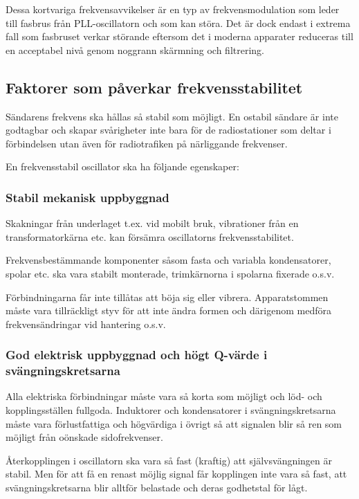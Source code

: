 Dessa kortvariga frekvensavvikelser är en typ av frekvensmodulation
som leder till fasbrus från PLL-oscillatorn och som kan störa.
Det är dock endast i extrema fall som fasbruset verkar störande eftersom det
i moderna apparater reduceras till en acceptabel nivå genom noggrann
skärmning och filtrering.

\subsection{Faktorer som påverkar frekvensstabilitet}

Sändarens frekvens ska hållas så stabil som möjligt.
En ostabil sändare är inte godtagbar och skapar svårigheter inte bara för de
radiostationer som deltar i förbindelsen utan även för radiotrafiken
på närliggande frekvenser.

En frekvensstabil oscillator ska ha följande egenskaper:

\subsubsection{Stabil mekanisk uppbyggnad}

Skakningar från underlaget t.ex. vid mobilt bruk, vibrationer från en
transformatorkärna etc. kan försämra oscillatorns frekvensstabilitet.

Frekvensbestämmande komponenter såsom fasta och variabla kondensatorer, spolar
etc. ska vara stabilt monterade, trimkärnorna i spolarna fixerade o.s.v.

Förbindningarna får inte tillåtas att böja sig eller vibrera.
Apparatstommen måste vara tillräckligt styv för att inte ändra formen och
därigenom medföra frekvensändringar vid hantering o.s.v.

\subsubsection{God elektrisk uppbyggnad och högt Q-värde i svängningskretsarna}

Alla elektriska förbindningar måste vara så korta som möjligt och löd-
och kopplingsställen fullgoda.
Induktorer och kondensatorer i svängningskretsarna måste vara förlustfattiga
och högvärdiga i övrigt så att signalen blir så ren som möjligt från oönskade
sidofrekvenser.

Återkopplingen i oscillatorn ska vara så fast (kraftig) att självsvängningen
är stabil.
Men för att få en renast möjlig signal får kopplingen inte vara så fast,
att svängningskretsarna blir alltför belastade och deras godhetstal för lågt.

